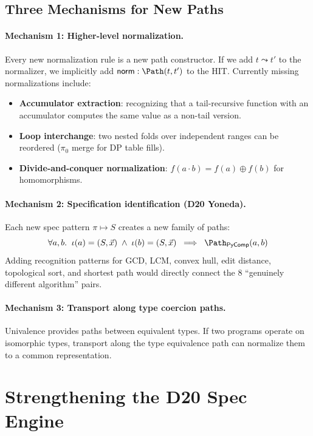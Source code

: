\subsection{Three Mechanisms for New Paths}

\paragraph{Mechanism 1: Higher-level normalization.}
Every new normalization rule is a new path constructor.
If we add $t \leadsto t'$ to the normalizer, we implicitly add
$\mathsf{norm} : \Path(t, t')$ to the HIT.
Currently missing normalizations include:
\begin{itemize}
  \item \textbf{Accumulator extraction}: recognizing that a
    tail-recursive function with an accumulator computes the same
    value as a non-tail version.
  \item \textbf{Loop interchange}: two nested folds over independent
    ranges can be reordered ($\pi_0$ merge for DP table fills).
  \item \textbf{Divide-and-conquer normalization}:
    $f(a \cdot b) = f(a) \oplus f(b)$ for homomorphisms.
\end{itemize}

\paragraph{Mechanism 2: Specification identification (D20 Yoneda).}
Each new spec pattern $\pi \mapsto S$ creates a new family of paths:
\[
  \forall a, b.\;\; \iota(a) = (S, \vec{x}) \;\wedge\;
  \iota(b) = (S, \vec{x})
  \;\implies\; \Path_{\mathsf{PyComp}}(a, b)
\]
Adding recognition patterns for GCD, LCM, convex hull, edit
distance, topological sort, and shortest path would directly
connect the 8 ``genuinely different algorithm'' pairs.

\paragraph{Mechanism 3: Transport along type coercion paths.}
Univalence provides paths between equivalent types.  If two
programs operate on isomorphic types, transport along the type
equivalence path can normalize them to a common representation.


\section{Strengthening the D20 Spec Engine}
\label{sec:strengthening-d20}

